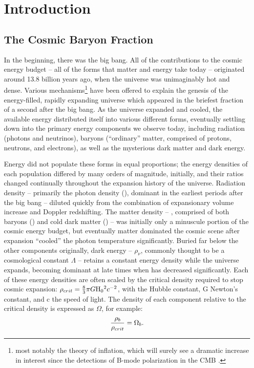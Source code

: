
\chapter{Introduction}
\label{chap:Intro}
\section{The Cosmic Baryon Fraction}
\label{sec:BaryonFraction}
In the beginning, there was the big bang. All of the contributions to
the cosmic energy budget -- all of the forms that matter and energy
take today -- originated around 13.8 billion years ago, when the
universe was unimaginably hot and dense. Various
mechanisms\footnote{most notably the theory of inflation, which will
  surely see a dramatic increase in interest since the detections of
  B-mode polarization in the CMB \citep{BICEP22014}.} have been
offered to explain the genesis of the energy-filled, rapidly expanding
universe which appeared in the briefest fraction of a second after the
big bang. As the universe expanded and cooled, the available energy
distributed itself into various different forms, eventually settling
down into the primary energy components we observe today, including
radiation (photons and neutrinos), baryons (``ordinary'' matter,
comprised of protons, neutrons, and electrons), as well as the
mysterious dark matter and dark energy. 

Energy did not populate these forms in equal proportions; the energy
densities of each population differed by many orders of magnitude,
initially, and their ratios changed continually throughout the
expansion history of the universe. Radiation density -- primarily the
photon density (\rhog), dominant in the earliest periods after
the big bang -- diluted quickly from the combination of expansionary
volume increase and Doppler redshifting. The matter density --
\rhom, comprised of both baryons (\rhob) and cold dark matter
(\rhoc) -- was initially only a minuscule portion of the cosmic
energy budget, but eventually matter dominated the cosmic scene after
expansion ``cooled'' the photon temperature significantly. Buried far
below the other components originally, dark energy -- $\rho_\nu$,
commonly thought to be a cosmological constant $\Lambda$ -- retains a
constant energy density while the universe expands, becoming dominant
at late times when \rhom{} has decreased significantly. Each of these
energy densities are often scaled by the critical density required to
stop cosmic expansion: $\rho_{crit} = \frac{8}{3}\pi{}G\textrm{H\ensuremath{_0}}{}^2c^{-2}$,
with \Ho{} the Hubble constant, G Newton's constant, and c the speed
of light. The density of each component relative to the critical
density is expressed as $\Omega$, for example:
\begin{equation}
\frac{\rho_b}{\rho_{crit}} = \Omega_b.  \nonumber
\end{equation}

